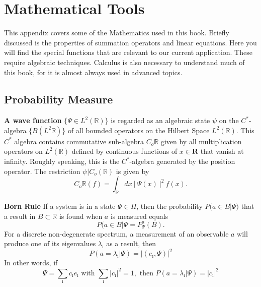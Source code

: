 \documentclass[11pt,fancy]{elegantbook}
\begin{document}
\cite{sylow1872theoremes,saunders2004derivation,lefschetz1913existence,lefschetz1937fixed,lefschetz1926intersections,kondyrev2020categorical,langlands1971euler,ter1996elliptic,taylor1988congruences,wan2012iwasawa,ribet1980division,billerey2013modularity,patankar2017distinguishing,langlands2006functional,bruinier20081,ter1996elliptic,green2011inverse,frey1994remark,diamond1997l,mazur1986p}
\printbibliography

\appendix


\chapter{Mathematical Tools}

This appendix covers some of the  Mathematics used in this book. Briefly discussed is the properties of summation operators and linear equations. Here you will find the special functions that are relevant to our current application. These require algebraic techniques. 
Calculus is also necessary to understand much of this book, for it is almost always used in advanced topics.

\section{Probability Measure}
\textbf{A wave function} $\{{\Psi} \in L^2(\mathbb{R})\}$ is regarded as an algebraic state ${\psi}$ on the ${C^{*}}$-algebra $\{B(L^{2}\mathbb{R})\}$ of all bounded operators on the Hilbert Space ${L^{2}(\mathbb{R})}$. This ${C^{*}}$ algebra contains commutative sub-algebra ${C_{o}{\mathbb{R}}}$ given by all multiplication operators on ${L^{2}(\mathbb{R})}$ defined by continuous functions of ${{x}\in{\mathbf{R}}}$ that vanish at infinity. 
Roughly speaking, this is the ${C^{*}}$-algebra generated by the position operator.
The restriction ${\psi}|{C_{o}{(\mathbb{R})}}$ is given by
\begin{equation}
C_{o}\mathbb{R}(f) = \int_{\mathbb{R}} dx \ {| \ {\Psi{(x)} \ |^2 \ {f(x)}}}.
\end{equation}

\textbf{Born Rule}
If a system is in a state ${\Psi \in H}$, then the probability ${P(a \in B | {\Psi}})$ that a result in ${B}\subset{\mathbb{R}}$ is found when $a$ is measured equals 
\begin{equation}
P{({a}\in{B} | {\Psi}} = P_{\Psi}^{a}(B).
\end{equation}
For a discrete non-degenerate spectrum, a measurement of an observable $a$ will produce one of its eigenvalues ${\lambda_{\imath}}$ as a result, then 
\begin{equation}
P{({a} = {\lambda_{\imath}} | \Psi)} = {|(e_{\imath}, {\Psi} )}|^2
\end{equation}
In other words, if 
\begin{equation}
\Psi = \sum_{\imath}{c_{\imath}e_{\imath}} \text{ with } \sum_{\imath} |c_{\imath}|^2 = 1, \text{ then } P{({a} = {\lambda_{\imath}} | \Psi)} = |{c_{\imath}}|^2
\end{equation}
\end{document}
